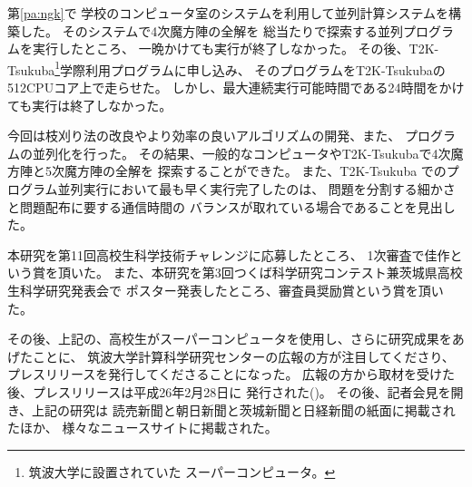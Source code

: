 \def \wrkdir {p.jsec/}

\label{pa:jsec}

第\ref{pa:ngk}\postmpartname{}で
学校のコンピュータ室のシステムを利用して並列計算システムを構築した。
そのシステムで4次魔方陣の全解を
総当たりで探索する並列プログラムを実行したところ、
一晩かけても実行が終了しなかった。
その後、T2K-Tsukuba\footnote{筑波大学に設置されていた
スーパーコンピュータ。}学際利用プログラムに申し込み、
そのプログラムをT2K-Tsukubaの512CPUコア上で走らせた。
しかし、最大連続実行可能時間である24時間をかけても実行は終了しなかった。

今回は枝刈り法の改良やより効率の良いアルゴリズムの開発、また、
プログラムの並列化を行った。
その結果、一般的なコンピュータやT2K-Tsukubaで4次魔方陣と5次魔方陣の全解を
探索することができた。
また、T2K-Tsukuba でのプログラム並列実行において最も早く実行完了したのは、
問題を分割する細かさと問題配布に要する通信時間の
バランスが取れている場合であることを見出した。

本研究を第11回高校生科学技術チャレンジに応募したところ、
1次審査で佳作という賞を頂いた。
また、本研究を第3回つくば科学研究コンテスト兼茨城県高校生科学研究発表会で
ポスター発表したところ、審査員奨励賞という賞を頂いた。

その後、上記の、高校生がスーパーコンピュータを使用し、さらに研究成果をあげたことに、
筑波大学計算科学研究センターの広報の方が注目してくださり、
プレスリリースを発行してくださることになった。
広報の方から取材を受けた後、プレスリリースは平成26年2月28日に
発行された(\cite{bib:ccs-pr})。
その後、記者会見を開き、上記の研究は
読売新聞と朝日新聞と茨城新聞と日経新聞の紙面に掲載されたほか、
様々なニュースサイトに掲載された。
